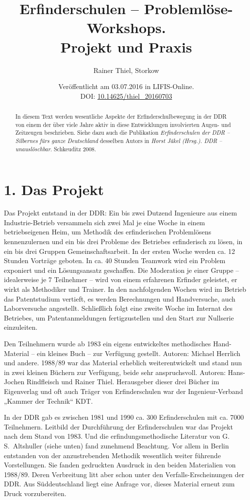 \documentclass[11pt,a4paper]{article}
\title{Erfinderschulen – Problemlöse-Workshops.\\[6pt] Projekt und Praxis}
\author{Rainer Thiel, Storkow}
\date{Veröffentlicht am 03.07.2016 in LIFIS-Online.\\[4pt] DOI:
  \url{10.14625/thiel_20160703}}
\begin{document}
\maketitle
\begin{abstract}\noindent
  In diesem Text werden wesentliche Aspekte der Erfinderschulbewegung in der
  DDR von einem der über viele Jahre aktiv in diese Entwicklungen involvierten
  Augen- und Zeitzeugen beschrieben.  Siehe dazu auch die Publikation
  \emph{Erfinderschulen der DDR -- Silbernes fürs ganze Deutschland} desselben
  Autors in \emph{Horst Jäkel (Hrsg.). DDR – unauslöschbar}.  Schkeuditz 2008.
\end{abstract}

\section*{1. Das Projekt}

Das Projekt entstand in der DDR: Ein bis zwei Dutzend Ingenieure aus einem
Industrie-Betrieb versammeln sich zwei Mal je eine Woche in einem
betriebseigenen Heim, um Methodik des erfinderischen Problemlösens
kennenzulernen und ein bis drei Probleme des Betriebes erfinderisch zu lösen,
in ein bis drei Gruppen Gemeinschaftsarbeit. In der ersten Woche werden ca. 12
Stunden Vorträge geboten. In ca. 40 Stunden Teamwork wird ein Problem exponiert
und ein Lösungsansatz geschaffen. Die Moderation je einer Gruppe – idealerweise
je 7 Teilnehmer – wird von einem erfahrenen Erfinder geleistet, er wirkt als
Methodiker und Trainer. In den nachfolgenden Wochen wird im Betrieb das
Patentstudium vertieft, es werden Berechnungen und Handversuche, auch
Laborversuche angestellt.  Schließlich folgt eine zweite Woche im Internat des
Betriebes, um Patentanmeldungen fertigzustellen und den Start zur Nullserie
einzuleiten.

Den Teilnehmern wurde ab 1983 ein eigens entwickeltes methodisches
Hand-Material -- ein kleines Buch -- zur Verfügung gestellt. Autoren: Michael
Herrlich und andere. 1988/89 war das Material erheblich weiterentwickelt und
stand nun in zwei kleinen Büchern zur Verfügung, beide sehr anspruchsvoll.
Autoren: Hans-Jochen Rindfleisch und Rainer Thiel.  Herausgeber dieser drei
Bücher im Eigenverlag und oft auch Träger von Erfinderschulen war der
Ingenieur-Verband „Kammer der Technik“ KDT.

In der DDR gab es zwischen 1981 und 1990 ca. 300 Erfinderschulen mit ca. 7000
Teilnehmern. Leitbild der Durchführung der Erfinderschulen war das Projekt nach
dem Stand von 1983. Und die erfindungsmethodische Literatur von
G.\,S.~Altshuller (siehe unten) fand zunehmend Beachtung.  Vor allem in Berlin
entstanden von der anzustrebenden Methodik wesentlich weiter führende
Vorstellungen. Sie fanden gedruckten Ausdruck in den beiden Materialien von
1988/89.  Deren Verbreitung litt aber schon unter den Verfalls-Erscheinungen
der DDR. Aus Süddeutschland liegt eine Anfrage vor, dieses Material erneut zum
Druck vorzubereiten.
\end{document}
